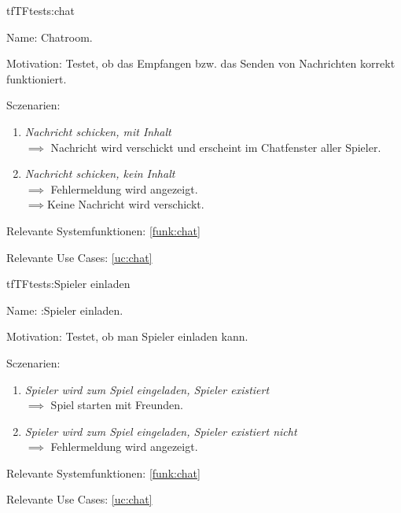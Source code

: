 \begin{description}[leftmargin=5em, style=sameline]

\begin{lhp}{tf}{TF}{tests:chat}
	\item [Name:] Chatroom.
	\item [Motivation:] Testet, ob das Empfangen bzw. das Senden von Nachrichten korrekt funktioniert.
	\item [Sczenarien:] \hfill
		\begin{enumerate}
			\item \textit{Nachricht schicken, mit Inhalt} \\ $\implies$ Nachricht wird verschickt und erscheint im Chatfenster aller Spieler.
			\item \textit{Nachricht schicken, kein Inhalt} \\ $\implies$ Fehlermeldung wird angezeigt.
										\\ $\implies$Keine Nachricht wird verschickt.
		\end{enumerate}
	\item [Relevante Systemfunktionen:] \ref{funk:chat}
	\item [Relevante Use Cases:] \ref{uc:chat}
\end{lhp}

\end{description}


\begin{description}[leftmargin=5em, style=sameline]

\begin{lhp}{tf}{TF}{tests:Spieler einladen}
	\item [Name:] :Spieler einladen.
	\item [Motivation:] Testet, ob man Spieler einladen kann.
	\item [Sczenarien:] \hfill
		\begin{enumerate}
			\item \textit{Spieler wird zum Spiel eingeladen, Spieler existiert} \\ $\implies$ Spiel starten mit Freunden.
			\item \textit{Spieler wird zum Spiel eingeladen, Spieler existiert nicht} \\ $\implies$ Fehlermeldung wird angezeigt.

		\end{enumerate}
	\item [Relevante Systemfunktionen:] \ref{funk:chat}
	\item [Relevante Use Cases:] \ref{uc:chat}
\end{lhp}

\end{description}

